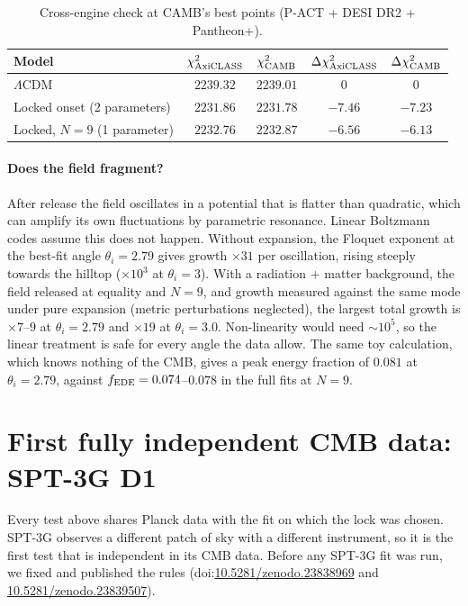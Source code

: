 \documentclass[11pt]{article}
\begin{document}
\begin{table}[h]
\centering
\small
\begin{tabular}{lcccc}
\toprule
Model & $\chi^2_{\rm AxiCLASS}$ & $\chi^2_{\rm CAMB}$ & $\Delta\chi^2_{\rm AxiCLASS}$ & $\Delta\chi^2_{\rm CAMB}$\\
\midrule
$\Lambda$CDM & $2239.32$ & $2239.01$ & $0$ & $0$\\
Locked onset (2 parameters) & $2231.86$ & $2231.78$ & $-7.46$ & $-7.23$\\
Locked, $N=9$ (1 parameter) & $2232.76$ & $2232.87$ & $-6.56$ & $-6.13$\\
\bottomrule
\end{tabular}
\caption{Cross-engine check at CAMB's best points (P-ACT + DESI DR2 + Pantheon+).}
\label{tab:engines}
\end{table}

\paragraph{Does the field fragment?} After release the field oscillates in a potential that is
flatter than quadratic, which can amplify its own fluctuations by parametric resonance. Linear
Boltzmann codes assume this does not happen. Without expansion, the Floquet exponent at the best-fit
angle $\theta_i=2.79$ gives growth $\times31$ per oscillation, rising steeply towards the hilltop
($\times10^3$ at $\theta_i=3$). With a radiation + matter background, the field released at equality
and $N=9$, and growth measured against the same mode under pure expansion (metric perturbations
neglected), the largest total growth is $\times7$--$9$ at $\theta_i=2.79$ and $\times19$ at
$\theta_i=3.0$. Non-linearity would need $\sim10^5$, so the linear treatment is safe for every angle
the data allow. The same toy calculation, which knows nothing of the CMB, gives a peak energy fraction
of $0.081$ at $\theta_i=2.79$, against $f_{\rm EDE}=0.074$--$0.078$ in the full fits at $N=9$.

\section{First fully independent CMB data: SPT-3G D1}\label{sec:spt}
Every test above shares Planck data with the fit on which the lock was chosen. SPT-3G observes a
different patch of sky with a different instrument, so it is the first test that is independent in
its CMB data. Before any SPT-3G fit was run, we fixed and published the rules
(doi:\href{https://doi.org/10.5281/zenodo.23838969}{10.5281/zenodo.23838969} and
\href{https://doi.org/10.5281/zenodo.23839507}{10.5281/zenodo.23839507}).
\end{document}
